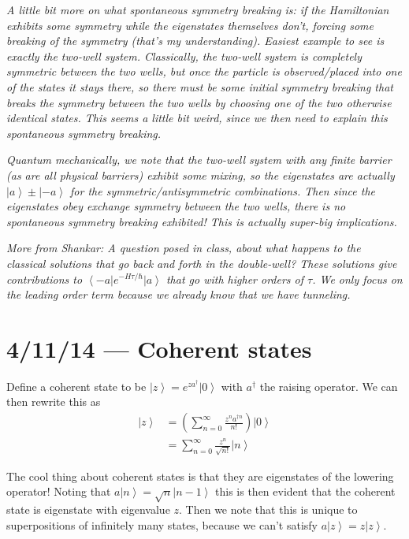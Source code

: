 \documentclass[10pt]{report}
\newcommand{\bra}[1]{\left<#1\right|}
\newcommand{\ket}[1]{\left|#1\right>}
\begin{document}
\emph{A little bit more on what spontaneous symmetry breaking is: if the Hamiltonian exhibits some symmetry while the eigenstates themselves don't, forcing some breaking of the symmetry (that's my understanding). Easiest example to see is exactly the two-well system. Classically, the two-well system is completely symmetric between the two wells, but once the particle is observed/placed into one of the states it stays there, so there must be some initial symmetry breaking that breaks the symmetry between the two wells by choosing one of the two otherwise identical states. This seems a little bit weird, since we then need to explain this spontaneous symmetry breaking.}

\emph{Quantum mechanically, we note that the two-well system with any finite barrier (as are all physical barriers) exhibit some mixing, so the eigenstates are actually $\ket{a} \pm \ket{-a}$ for the symmetric/antisymmetric combinations. Then since the eigenstates obey exchange symmetry between the two wells, there is no spontaneous symmetry breaking exhibited! This is actually super-big implications.}

\emph{More from Shankar: A question posed in class, about what happens to the classical solutions that go back and forth in the double-well? These solutions give contributions to $\bra{-a}e^{-H\tau/\hbar}\ket{a}$ that go with higher orders of $\tau$. We only focus on the leading order term because we already know that we have tunneling.}

\chapter{4/11/14 --- Coherent states}

Define a coherent state to be $\ket{z} = e^{za^\dagger}\ket{0}$ with $a^\dagger$ the raising operator. We can then rewrite this as
\begin{align}
    \ket{z} &= \left(\sum_{n=0}^{\infty} \frac{z^na^{\dagger n}}{n!}\right)\ket{0}\\
    &= \sum_{n=0}^{\infty}\frac{z^n}{\sqrt{n!}}\ket{n}
\end{align}

The cool thing about coherent states is that they are eigenstates of the lowering operator! Noting that $a\ket{n} = \sqrt{n}\ket{n-1}$ this is then evident that the coherent state is eigenstate with eigenvalue $z$. Then we note that this is unique to superpositions of infinitely many states, because we can't satisfy $a \ket{z} = z\ket{z}$.
\end{document}
